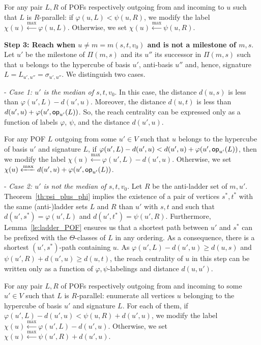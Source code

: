 \documentclass{article}
\newcommand{\opp}{\mbox{\textsf{op}}}
\begin{document}
For any pair $L,R$ of POFs respectively outgoing from and incoming to $u$ such that $L$ is $R$-parallel: if $\varphi(u,L) < \psi(u,R)$, we modify the label $\chi(u) \xleftarrow{\max} \varphi(u,L)$. Otherwise, we set $\chi(u) \xleftarrow{\max} \psi(u,R)$.

\textbf{Step 3: Reach when $u\neq m=m(s,t,v_0)$ and is not a milestone of $m,s$}. Let $u'$ be the milestone of $\Pi(m,s)$ and its $u''$ its successor in $\Pi(m,s)$ such that $u$ belongs to the hypercube of basis $u'$, anti-basis $u''$ and, hence, signature $L = L_{u',u''} = \sigma_{u',u''}$. We distinguish two cases.

- \textit{Case 1: $u'$ is the median of $s,t,v_0$}. In this case, the distance $d(u,s)$ is less than $\varphi(u',L)-d(u',u)$. Moreover, the distance $d(u,t)$ is less than $d(u',u)+\varphi(u',\opp_{u'}(L))$. So, the  reach centrality can be expressed only as a function of labels $\varphi$, $\psi$, and the distance $d(u',u)$.

For any POF $L$ outgoing from some $u' \in V$ such that $u$ belongs to the hypercube of basis $u'$ and signature $L$, if $\varphi(u',L)-d(u',u) < d(u',u)+\varphi(u',\opp_{u'}(L))$, then we modify the label $\chi(u) \xleftarrow{\max} \varphi(u',L)-d(u',u)$. Otherwise, we set $\chi(u) \xleftarrow{\max} d(u',u)+\varphi(u',\opp_{u'}(L))$.

- \textit{Case 2: $u'$ is not the median of $s,t,v_0$}. Let $R$ be the anti-ladder set of $m,u'$. Theorem~\ref{th:psi_plus_phi} implies the existence of a pair of vertices $s^*,t^*$ with the same (anti-)ladder sets $L$ and $R$ than $u'$ with $s,t$ and such that $d(u',s^*) = \varphi(u',L)$ and $d(u',t^*) = \psi(u',R)$. Furthermore, Lemma~\ref{le:ladder_POF} ensures us that a shortest path between $u'$ and $s^*$ can be prefixed with the $\Theta$-classes of $L$ in any ordering. As a consequence, there is a shortest $(u',s^*)$-path containing $u$. As $\varphi(u',L)-d(u',u) \ge d(u,s)$ and $\psi(u',R) + d(u',u) \ge d(u,t)$, the  reach centrality of $u$ in this step can be written only as a function of  $\varphi,\psi$-labelings and distance $d(u,u')$.

For any pair $L,R$ of POFs respectively outgoing from and incoming to some $u' \in V$ such that $L$ is $R$-parallel: enumerate all vertices $u$ belonging to the hypercube of basis $u'$ and signature $L$. For each of them, if $\varphi(u',L)-d(u',u) < \psi(u,R)+d(u',u)$, we modify the label $\chi(u) \xleftarrow{\max} \varphi(u',L)-d(u',u)$. Otherwise, we set $\chi(u) \xleftarrow{\max} \psi(u',R)+d(u',u)$.
\end{document}
